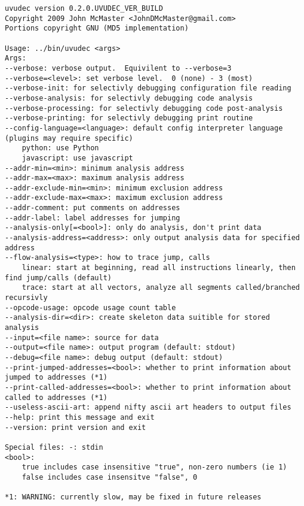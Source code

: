 \begin{verbatim}
uvudec version 0.2.0.UVUDEC_VER_BUILD
Copyright 2009 John McMaster <JohnDMcMaster@gmail.com>
Portions copyright GNU (MD5 implementation)

Usage: ../bin/uvudec <args>
Args:
--verbose: verbose output.  Equivilent to --verbose=3
--verbose=<level>: set verbose level.  0 (none) - 3 (most)
--verbose-init: for selectivly debugging configuration file reading
--verbose-analysis: for selectivly debugging code analysis
--verbose-processing: for selectivly debugging code post-analysis
--verbose-printing: for selectivly debugging print routine
--config-language=<language>: default config interpreter language (plugins may require specific)
	python: use Python
	javascript: use javascript
--addr-min=<min>: minimum analysis address
--addr-max=<max>: maximum analysis address
--addr-exclude-min=<min>: minimum exclusion address
--addr-exclude-max=<max>: maximum exclusion address
--addr-comment: put comments on addresses
--addr-label: label addresses for jumping
--analysis-only[=<bool>]: only do analysis, don't print data
--analysis-address=<address>: only output analysis data for specified address
--flow-analysis=<type>: how to trace jump, calls
	linear: start at beginning, read all instructions linearly, then find jump/calls (default)
	trace: start at all vectors, analyze all segments called/branched recursivly
--opcode-usage: opcode usage count table
--analysis-dir=<dir>: create skeleton data suitible for stored analysis
--input=<file name>: source for data
--output=<file name>: output program (default: stdout)
--debug=<file name>: debug output (default: stdout)
--print-jumped-addresses=<bool>: whether to print information about jumped to addresses (*1)
--print-called-addresses=<bool>: whether to print information about called to addresses (*1)
--useless-ascii-art: append nifty ascii art headers to output files
--help: print this message and exit
--version: print version and exit

Special files: -: stdin
<bool>:
	true includes case insensitive "true", non-zero numbers (ie 1)
	false includes case insensitve "false", 0

*1: WARNING: currently slow, may be fixed in future releases
\end{verbatim}
